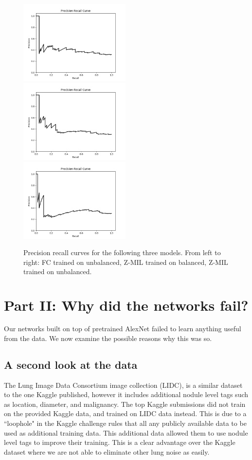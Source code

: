 \documentclass[twocolumn,10pt]{article}
\begin{document}
\begin{figure}
\label{lung_pr_curves}
\includegraphics[width=15em]{imgs/alexslicerunbalancednotrim_pr.png}
\includegraphics[width=15em]{imgs/alexslicerZMIL_pr.png}
\includegraphics[width=15em]{imgs/alexslicerZMILunbalancednotrim_pr.png}
\caption{Precision recall curves for the following three models. From left to
right: FC trained on unbalanced, Z-MIL trained on balanced, Z-MIL trained on
unbalanced.}
\end{figure}

\section{Part II: Why did the networks fail?}

Our networks built on top of pretrained AlexNet failed to learn anything useful from the data. We now examine the possible reasons why this was so. 

\subsection{A second look at the data}

The Lung Image Data Consortium image collection (LIDC), is a similar dataset to the one Kaggle published, however it includes additional nodule level tags such as location, diameter, and malignancy. The top Kaggle submissions did not train on the provided Kaggle data, and trained on LIDC data instead. This is due to a ``loophole" in the Kaggle challenge rules that all any publicly available data to be used as additional training data. This additional data allowed them to use nodule level tags to improve their training. This is a clear advantage over the Kaggle dataset where we are not able to eliminate other lung noise as easily. 
\end{document}
